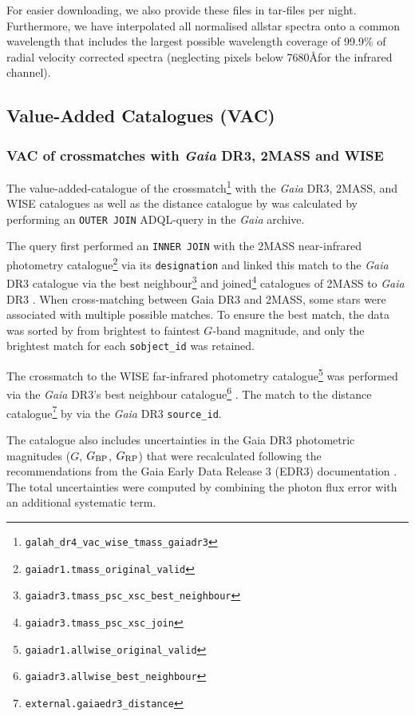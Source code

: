 \documentclass[
  journal=pasa,
  manuscript=research-paper, %
  year=2024,
  volume=37
]{cup-journal}
\newcommand{\Gaia}{\textit{Gaia}\xspace}
\begin{document}
For easier downloading, we also provide these files in tar-files per night. Furthermore, we have interpolated all normalised allstar spectra onto a common wavelength that includes the largest possible wavelength coverage of 99.9\% of radial velocity corrected spectra (neglecting pixels below 7680\AA for the infrared channel).

\subsection{Value-Added Catalogues (VAC)}

\subsubsection{VAC of crossmatches with \Gaia DR3, 2MASS and WISE} \label{sec:vac_crossmatch}

The value-added-catalogue of the crossmatch\footnote{\texttt{galah\_dr4\_vac\_wise\_tmass\_gaiadr3}} with the \Gaia DR3, 2MASS, and WISE catalogues as well as the distance catalogue by \citet{BailerJones2021} was calculated by performing an \texttt{OUTER JOIN} ADQL-query in the \Gaia archive. 

The query first performed an \texttt{INNER JOIN} with the 2MASS near-infrared photometry catalogue\footnote{\texttt{gaiadr1.tmass\_original\_valid}} \citep{Skrutskie2006} via its \texttt{designation} and linked this match to the \Gaia DR3 catalogue via the best neighbour\footnote{ \texttt{gaiadr3.tmass\_psc\_xsc\_best\_neighbour}} and joined\footnote{\texttt{gaiadr3.tmass\_psc\_xsc\_join}} catalogues of 2MASS to \Gaia DR3 \citep{Torra2021}. When cross-matching between Gaia DR3 and 2MASS, some stars were associated with multiple possible matches. To ensure the best match, the data was sorted by from brightest to faintest \(G\)-band magnitude, and only the brightest match for each \texttt{sobject\_id} was retained.

The crossmatch to the WISE far-infrared photometry catalogue\footnote{\texttt{gaiadr1.allwise\_original\_valid}} \citep{Cutri2013} was performed via the \Gaia DR3's best neighbour catalogue\footnote{\texttt{gaiadr3.allwise\_best\_neighbour}} \citep{Torra2021}. The match to the distance catalogue\footnote{\texttt{external.gaiaedr3\_distance}} by \citet{BailerJones2021}  via the \Gaia DR3 \texttt{source\_id}.

The catalogue also includes uncertainties in the Gaia DR3 photometric magnitudes (\(G\), \(G_{\rm BP}\), \(G_{\rm RP}\)) that were recalculated following the recommendations from the Gaia Early Data Release 3 (EDR3) documentation \citep{Riello2021}. The total uncertainties were computed by combining the photon flux error with an additional systematic term.
\end{document}
